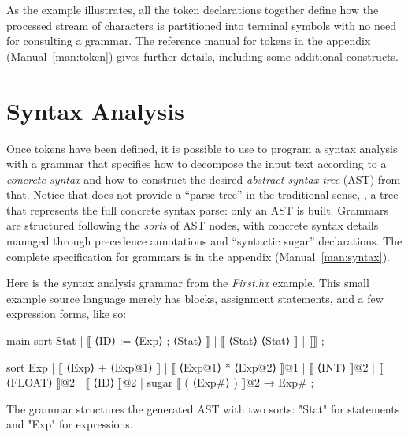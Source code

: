 \documentclass[11pt]{article} %
\begin{document}
As the example illustrates, all the token declarations together define how the processed stream of
characters is partitioned into terminal symbols with no need for consulting a grammar.
The reference manual for tokens in the appendix (Manual~\ref{man:token}) gives further details,
including some additional constructs.


\section{Syntax Analysis}
\label{sec:syntax}

Once tokens have been defined, it is possible to use \HAX to program a syntax analysis with a grammar
that specifies how to decompose the input text according to a \emph{concrete syntax} and how to
construct the desired \emph{abstract syntax tree} (AST) from that. Notice that \HAX does not provide
a ``parse tree'' in the traditional sense, \ie, a tree that represents the full concrete syntax
parse: only an AST is built.  Grammars are structured following the \emph{sorts} of AST nodes, with
concrete syntax details managed through precedence annotations and ``syntactic sugar''
declarations. The complete specification for grammars is in the appendix (Manual~\ref{man:syntax}).

\begin{example}\label{ex:syntax}
  Here is the syntax analysis grammar from the \emph{First.hx} example. This small example source
  language merely has blocks, assignment statements, and a few expression forms, like so:
  \begin{hacs}[xleftmargin=\parindent,xrightmargin=2em,numbers=right]
main sort Stat  | ⟦ ⟨ID⟩ := ⟨Exp⟩ ; ⟨Stat⟩ ⟧
                | ⟦ { ⟨Stat⟩ } ⟨Stat⟩ ⟧
                | ⟦⟧ ;

sort Exp  | ⟦ ⟨Exp⟩ + ⟨Exp@1⟩ ⟧
           | ⟦ ⟨Exp@1⟩ * ⟨Exp@2⟩ ⟧@1
           | ⟦ ⟨INT⟩ ⟧@2
           | ⟦ ⟨FLOAT⟩ ⟧@2
           | ⟦ ⟨ID⟩ ⟧@2
           | sugar ⟦ ( ⟨Exp#⟩ ) ⟧@2 → Exp# ;
  \end{hacs}
  The grammar structures the generated AST with two sorts: "Stat" for statements and "Exp" for
  expressions.
\end{example}
\end{document}
